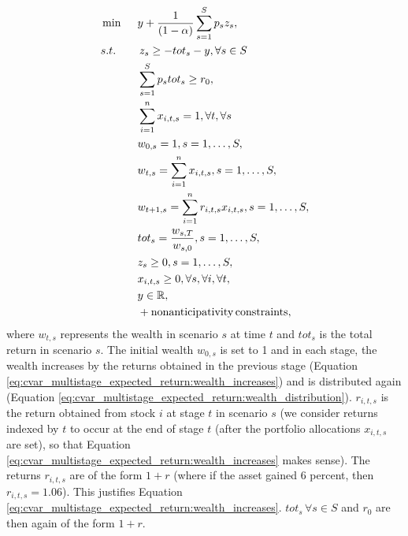 \begin{alignat}{10}
& \min \, \, \, && y + \frac{1}{(1-\alpha)} \sum_{s=1}^S p_s z_s, \label{eq:cvar_multistage_expected_return}  \\
&s.t. && \, z_s \geq  -tot_s -y, \forall s \in S \nonumber \\
&  && \sum_{s=1}^{S} p_s tot_s \geq r_0, \nonumber \\
&  && \sum_{i=1}^{n} x_{i,t,s} = 1, \forall t, \forall s \nonumber \\
& && w_{0,s}=1, s=1,\dots,S, \nonumber \\
& && w_{t,s}=\sum_{i=1}^{n} x_{i,t,s}, s=1,\dots,S, \label{eq:cvar_multistage_expected_return:wealth_distribution} \\
& && w_{t+1,s}=\sum_{i=1}^{n} r_{i,t,s} x_{i,t,s}, s=1,\dots,S, \label{eq:cvar_multistage_expected_return:wealth_increases} \\
& && tot_s = \frac{w_{s,T}}{w_{s,0}}, s=1,\dots,S, \nonumber \\
& && z_s \geq 0, s=1,\dots,S, \nonumber \\
& && x_{i,t,s} \geq 0, \forall s, \forall i, \forall t, \nonumber \\
& && y \in \R ,\nonumber \\
& && + \mathrm{nonanticipativity \, constraints}, \nonumber
\end{alignat}
where $w_{t,s}$ represents the wealth in scenario $s$ at time $t$ and $tot_s$ is the total return in scenario $s$. The initial wealth $w_{0,s}$ is set to 1 and in each stage, the wealth increases by the returns obtained in the previous stage (Equation \ref{eq:cvar_multistage_expected_return:wealth_increases}) and is distributed again (Equation \ref{eq:cvar_multistage_expected_return:wealth_distribution}). $r_{i,t,s}$ is the return obtained from stock $i$ at stage $t$ in scenario $s$ (we consider returns indexed by $t$ to occur at the end of stage $t$ (after the portfolio allocations $x_{i,t,s}$ are set), so that Equation \ref{eq:cvar_multistage_expected_return:wealth_increases} makes sense). The returns $r_{i,t,s}$ are of the form $1+r$ (where if the asset gained 6 percent, then $r_{i,t,s}=1.06$). This justifies Equation \ref{eq:cvar_multistage_expected_return:wealth_increases}. $tot_s \, \forall s \in S$ and $r_0$ are then again of the form $1+r$.

